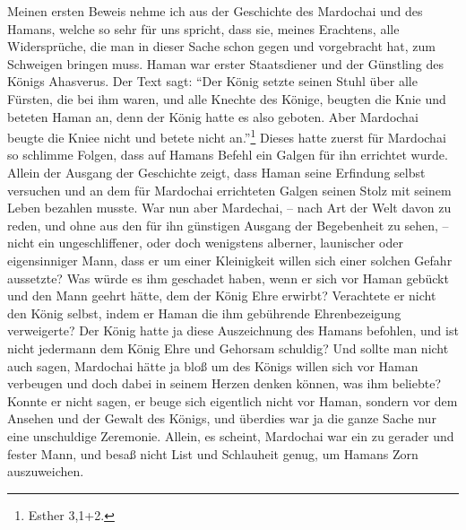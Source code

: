 Meinen ersten Beweis nehme ich aus der Geschichte des
Mardochai und des Hamans,
welche so sehr für uns spricht, dass sie, meines Erachtens, alle Widersprüche,
die man in dieser Sache schon gegen und vorgebracht hat, zum Schweigen bringen
muss. Haman war erster Staatsdiener und der Günstling des Königs Ahasverus. Der
Text sagt:
"`Der König setzte seinen Stuhl über alle Fürsten, die bei ihm waren,
und alle Knechte des Könige, beugten die Knie und beteten Haman an, denn der
König hatte es also geboten. Aber Mardochai beugte die Kniee nicht und betete
nicht an."'\footnote{Esther 3,1+2.}
Dieses hatte zuerst für Mardochai so
schlimme Folgen, dass auf Hamans Befehl ein Galgen für ihn errichtet wurde.
Allein
der Ausgang der Geschichte zeigt, dass Haman seine Erfindung selbst versuchen
und an dem für Mardochai errichteten Galgen seinen Stolz mit seinem Leben
bezahlen musste. War nun aber Mardechai, -- nach Art der Welt davon zu reden,
und
ohne aus den für ihn günstigen Ausgang der Begebenheit zu sehen, -- nicht ein
ungeschliffener, oder doch wenigstens alberner, launischer oder eigensinniger
Mann, dass er um einer Kleinigkeit willen sich einer solchen Gefahr aussetzte?
Was würde es ihm geschadet haben, wenn er sich vor
Haman gebückt und den Mann geehrt hätte, dem der König Ehre erwirbt? Verachtete
er nicht den König selbst, indem er Haman die ihm gebührende Ehrenbezeigung
verweigerte? Der König hatte ja diese Auszeichnung des Hamans befohlen, und ist
nicht jedermann dem König Ehre und Gehorsam schuldig? Und sollte man nicht auch
sagen, Mardochai hätte ja bloß um des Königs willen sich vor Haman verbeugen und
doch dabei in seinem Herzen denken können, was ihm beliebte? Konnte er nicht
sagen, er beuge sich eigentlich nicht vor Haman, sondern vor dem Ansehen und der
Gewalt des Königs, und überdies war ja die ganze Sache nur eine unschuldige
Zeremonie. Allein, es scheint, Mardochai war ein zu gerader und fester Mann, und
besaß nicht List und Schlauheit genug, um Hamans Zorn auszuweichen.


